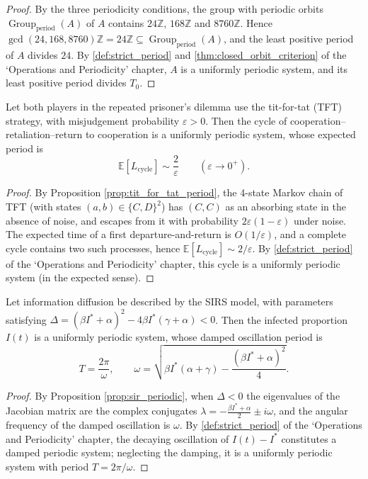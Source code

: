 \begin{proof}
By the three periodicity conditions, the group with periodic orbits $\operatorname{Group}_{\mathrm{period}}(A)$ of $A$ contains $24\mathbb Z$, $168\mathbb Z$ and $8760\mathbb Z$. Hence $\gcd(24,168,8760)\mathbb Z=24\mathbb Z\subseteq\operatorname{Group}_{\mathrm{period}}(A)$, and the least positive period of $A$ divides $24$. By \cref{def:strict_period} and \cref{thm:closed_orbit_criterion} of the `Operations and Periodicity' chapter, $A$ is a uniformly periodic system, and its least positive period divides $T_0$.
\end{proof}

\begin{lemma}\label{lem:tft_periodic}
Let both players in the repeated prisoner's dilemma use the tit-for-tat (TFT) strategy, with misjudgement probability $\varepsilon>0$. Then the cycle of cooperation--retaliation--return to cooperation is a uniformly periodic system, whose expected period is
\[
\mathbb{E}[L_{\text{cycle}}]\sim \frac{2}{\varepsilon}\qquad(\varepsilon\to0^+).
\]
\end{lemma}

\begin{proof}
By Proposition \ref{prop:tit_for_tat_period}, the 4-state Markov chain of TFT (with states $(a,b)\in\{C,D\}^2$) has $(C,C)$ as an absorbing state in the absence of noise, and escapes from it with probability $2\varepsilon(1-\varepsilon)$ under noise. The expected time of a first departure-and-return is $O(1/\varepsilon)$, and a complete cycle contains two such processes, hence $\mathbb{E}[L_{\text{cycle}}]\sim2/\varepsilon$. By \cref{def:strict_period} of the `Operations and Periodicity' chapter, this cycle is a uniformly periodic system (in the expected sense).
\end{proof}

\begin{lemma}\label{lem:sirs_periodic}
Let information diffusion be described by the SIRS model, with parameters satisfying $\Delta=(\beta I^*+\alpha)^2-4\beta I^*(\gamma+\alpha)<0$. Then the infected proportion $I(t)$ is a uniformly periodic system, whose damped oscillation period is
\[
T=\frac{2\pi}{\omega},\qquad \omega=\sqrt{\beta I^*(\alpha+\gamma)-\frac{(\beta I^*+\alpha)^2}{4}}.
\]
\end{lemma}

\begin{proof}
By Proposition \ref{prop:sir_periodic}, when $\Delta<0$ the eigenvalues of the Jacobian matrix are the complex conjugates $\lambda=-\frac{\beta I^*+\alpha}{2}\pm i\omega$, and the angular frequency of the damped oscillation is $\omega$. By \cref{def:strict_period} of the `Operations and Periodicity' chapter, the decaying oscillation of $I(t)-I^*$ constitutes a damped periodic system; neglecting the damping, it is a uniformly periodic system with period $T=2\pi/\omega$.
\end{proof}

